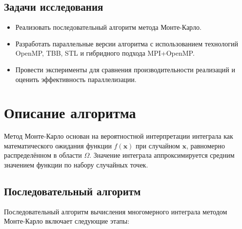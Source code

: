 \documentclass[12pt,a4paper]{extarticle}
\begin{document}
\subsection{Задачи исследования}
\begin{itemize}
    \item Реализовать последовательный алгоритм метода Монте-Карло.
    \item Разработать параллельные версии алгоритма с использованием технологий OpenMP, TBB, STL и гибридного подхода MPI+OpenMP.
    \item Провести эксперименты для сравнения производительности реализаций и оценить эффективность параллелизации.
\end{itemize}

\newpage
\section{Описание алгоритма}
Метод Монте-Карло основан на вероятностной интерпретации интеграла как математического ожидания функции \(f(\mathbf{x})\) при случайном \(\mathbf{x}\), равномерно распределённом в области \(\Omega\). Значение интеграла аппроксимируется средним значением функции по набору случайных точек.

\subsection{Последовательный алгоритм}
Последовательный алгоритм вычисления многомерного интеграла методом Монте-Карло включает следующие этапы:
\end{document}
